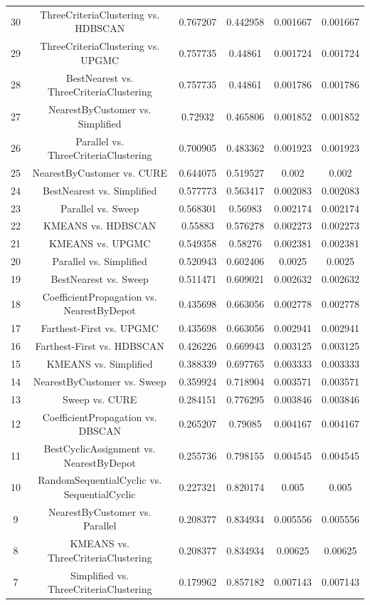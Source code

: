 \documentclass[a4paper,10pt]{article}
\begin{document}
\begin{landscape}
\begin{table}[!htp]
\begin{tabular}{cccccc}
30&ThreeCriteriaClustering vs. HDBSCAN&0.767207&0.442958&0.001667&0.001667\\
29&ThreeCriteriaClustering vs. UPGMC&0.757735&0.44861&0.001724&0.001724\\
28&BestNearest vs. ThreeCriteriaClustering&0.757735&0.44861&0.001786&0.001786\\
27&NearestByCustomer vs. Simplified&0.72932&0.465806&0.001852&0.001852\\
26&Parallel vs. ThreeCriteriaClustering&0.700905&0.483362&0.001923&0.001923\\
25&NearestByCustomer vs. CURE&0.644075&0.519527&0.002&0.002\\
24&BestNearest vs. Simplified&0.577773&0.563417&0.002083&0.002083\\
23&Parallel vs. Sweep&0.568301&0.56983&0.002174&0.002174\\
22&KMEANS vs. HDBSCAN&0.55883&0.576278&0.002273&0.002273\\
21&KMEANS vs. UPGMC&0.549358&0.58276&0.002381&0.002381\\
20&Parallel vs. Simplified&0.520943&0.602406&0.0025&0.0025\\
19&BestNearest vs. Sweep&0.511471&0.609021&0.002632&0.002632\\
18&CoefficientPropagation vs. NearestByDepot&0.435698&0.663056&0.002778&0.002778\\
17&Farthest-First vs. UPGMC&0.435698&0.663056&0.002941&0.002941\\
16&Farthest-First vs. HDBSCAN&0.426226&0.669943&0.003125&0.003125\\
15&KMEANS vs. Simplified&0.388339&0.697765&0.003333&0.003333\\
14&NearestByCustomer vs. Sweep&0.359924&0.718904&0.003571&0.003571\\
13&Sweep vs. CURE&0.284151&0.776295&0.003846&0.003846\\
12&CoefficientPropagation vs. DBSCAN&0.265207&0.79085&0.004167&0.004167\\
11&BestCyclicAssignment vs. NearestByDepot&0.255736&0.798155&0.004545&0.004545\\
10&RandomSequentialCyclic vs. SequentialCyclic&0.227321&0.820174&0.005&0.005\\
9&NearestByCustomer vs. Parallel&0.208377&0.834934&0.005556&0.005556\\
8&KMEANS vs. ThreeCriteriaClustering&0.208377&0.834934&0.00625&0.00625\\
7&Simplified vs. ThreeCriteriaClustering&0.179962&0.857182&0.007143&0.007143\\

\end{tabular}
\end{table}
\end{landscape}
\end{document}

